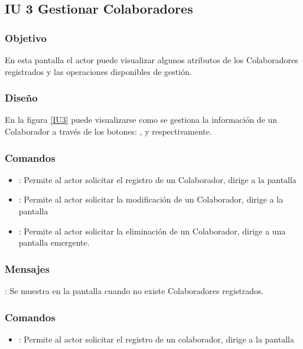 \subsection{IU 3 Gestionar Colaboradores}

\subsubsection{Objetivo}
	En esta pantalla el actor puede visualizar algunos atributos de los Colaboradores registrados y las operaciones disponibles de gestión.
\subsubsection{Diseño}
	En la figura \ref{IU3} puede visualizarse como se gestiona la información de un Colaborador a través de los botones: , \editar y \eliminar respectivamente.

\label{IU3}
\subsubsection{Comandos}
\begin{itemize}
	\item {}: Permite al actor solicitar el registro de un Colaborador, dirige a la pantalla 
	\item \editar [Modificar]: Permite al actor solicitar la modificación de un Colaborador, dirige a la pantalla 
	\item \eliminar [Eliminar]: Permite al actor solicitar la eliminación de un Colaborador, dirige a una pantalla emergente.
\end{itemize}

\subsubsection{Mensajes}

\begin{Citemize}
	\item {}: Se muestra en la pantalla  cuando no existe Colaboradores registrados.
\end{Citemize}

\label{IU3A}
\subsubsection{Comandos}
\begin{itemize}
	\item {}: Permite al actor solicitar el registro de un colaborador, dirige a la pantalla 
\end{itemize}